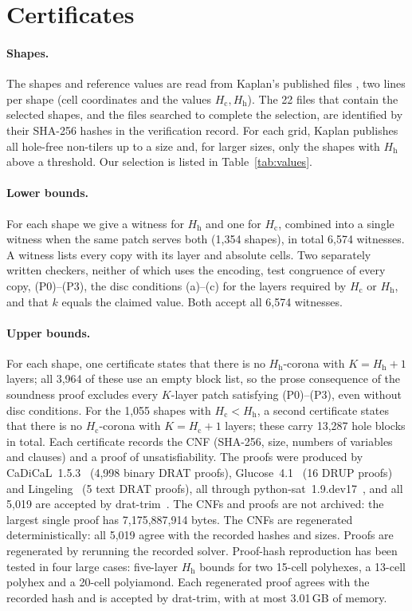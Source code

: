 \documentclass[10pt,a4paper]{article}
\theoremstyle{definition}
\theoremstyle{remark}
\newcommand{\Hc}{H_{\mathrm c}}
\newcommand{\Hh}{H_{\mathrm h}}
\begin{document}
\section{Certificates}
\label{sec:certificates}
\paragraph{Shapes.}
The shapes and reference values are read from Kaplan's published files
\cite{Kaplan}, two lines per shape (cell coordinates and the values
$\Hc,\Hh$). The 22 files that contain the selected shapes, and the
files searched to complete the selection, are identified by their SHA-256
hashes in the verification record. For each grid, Kaplan publishes all
hole-free non-tilers up to a size and, for larger sizes, only the shapes with $\Hh$ above a
threshold. Our selection is listed in Table~\ref{tab:values}.

\paragraph{Lower bounds.}
For each shape we give a witness for $\Hh$ and one for $\Hc$, combined into
a single witness when the same patch serves both (1,354 shapes), in total
6,574 witnesses. A witness lists every copy with its layer and absolute
cells. Two separately written checkers, neither of which uses the
encoding, test congruence of every copy, (P0)--(P3),
the disc conditions (a)--(c) for the layers required by $\Hc$ or $\Hh$,
and that $k$ equals the claimed value. Both accept all 6,574 witnesses.

\paragraph{Upper bounds.}
For each shape, one certificate states that there is no $\Hh$-corona with
$K=\Hh+1$ layers; all 3,964 of these use an empty block list, so the prose consequence of the soundness proof excludes every
$K$-layer patch satisfying (P0)--(P3), even without disc conditions. For the 1,055 shapes
with $\Hc<\Hh$, a second certificate states that there is no $\Hc$-corona
with $K=\Hc+1$ layers; these carry 13,287 hole blocks in total. Each
certificate records the CNF (SHA-256, size, numbers of variables and
clauses) and a proof of unsatisfiability. The proofs were produced by
CaDiCaL~1.5.3~\cite{CaDiCaL} (4,998 binary DRAT proofs),
Glucose~4.1~\cite{Glucose} (16 DRUP proofs) and
Lingeling~\cite{Lingeling} (5 text DRAT proofs), all through
python-sat~1.9.dev17~\cite{PySAT}, and all
5,019 are accepted by drat-trim~\cite{dratTrim}. The CNFs and proofs are
not archived: the largest single proof has 7,175,887,914 bytes. The CNFs
are regenerated deterministically: all 5,019 agree with the recorded
hashes and sizes. Proofs are regenerated by rerunning the recorded
solver. Proof-hash reproduction has been tested in four large cases:
five-layer $\Hh$ bounds for two 15-cell polyhexes, a 13-cell polyhex and
a 20-cell polyiamond. Each regenerated proof agrees with the recorded
hash and is accepted by drat-trim, with at most 3.01\,GB of memory.
\end{document}

